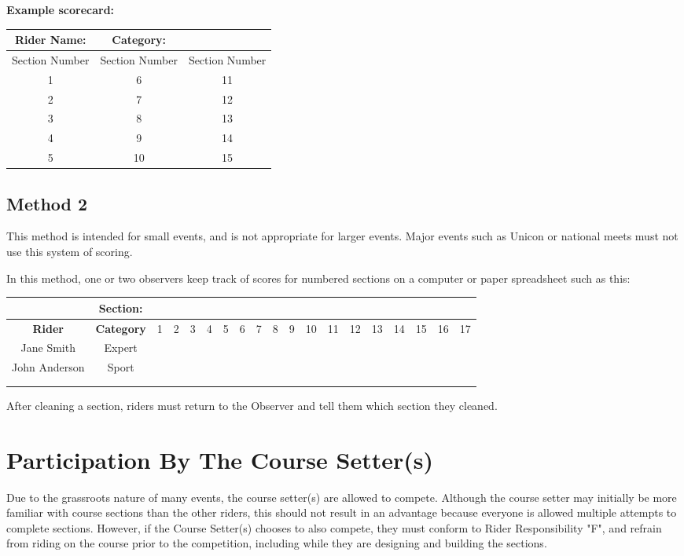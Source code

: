 \textbf{Example scorecard:}


\begin{tabular}{|c|c|c|}
\hline 
\textbf{Rider Name:} & \textbf{Category:} &  \\ 
\hline 
Section Number  & Section Number  & Section Number \\ 
\hline 
1 & 6 & 11 \\ 
\hline 
2 & 7 & 12 \\ 
\hline 
3 & 8 & 13 \\ 
\hline 
4 & 9 & 14 \\ 
\hline 
5 & 10 & 15 \\ 
\hline 
\end{tabular}

\subsection{Method 2} 
This method is intended for small events, and is not appropriate for larger events. 
Major events such as Unicon or national meets must not use this system of scoring.

In this method, one or two observers keep track of scores for numbered sections on a computer or paper spreadsheet such as this:


\begin{tabular}{|c|c|c|c|c|c|c|c|c|c|c|c|c|c|c|c|c|c|c|}
\hline 
 & \textbf{Section:} & & &  & &  &  &  &  &  & & & &  &  &  &  &  \\ 
\hline 
\textbf{Rider} & \textbf{Category} & 1 & 2 & 3 & 4 & 5 & 6 & 7 & 8 & 9 & 10 & 11 & 12 & 13 & 14 & 15 & 16 & 17 \\ 
\hline 
Jane Smith & Expert &  &  &  &  &  &  &  & &  &  &  & &  &  & &  &  \\ 
\hline 
John Anderson & Sport &  &  & &  &  &  &  & &  &  &  &  &  &  &  &  & \\ 
\hline 
 & &  & & &  &  &  &  &  & & &  & &  & &  & &  \\ 
\hline 
 & &  & & &  &  &  &  &  & & &  & &  & &  & &  \\ 
\hline 
\end{tabular} 


After cleaning a section, riders must return to the Observer and tell them which section they cleaned.

\section{Participation By The Course Setter(s)}
Due to the grassroots nature of many events, the course setter(s) are allowed to compete. 
Although the course setter may initially be more familiar with course sections than the other riders, this should not result in an advantage because everyone is allowed multiple attempts to complete sections. 
However, if the Course Setter(s) chooses to also compete, they must conform to Rider Responsibility "F", and refrain from riding on the course prior to the competition, including while they are designing and building the sections.

